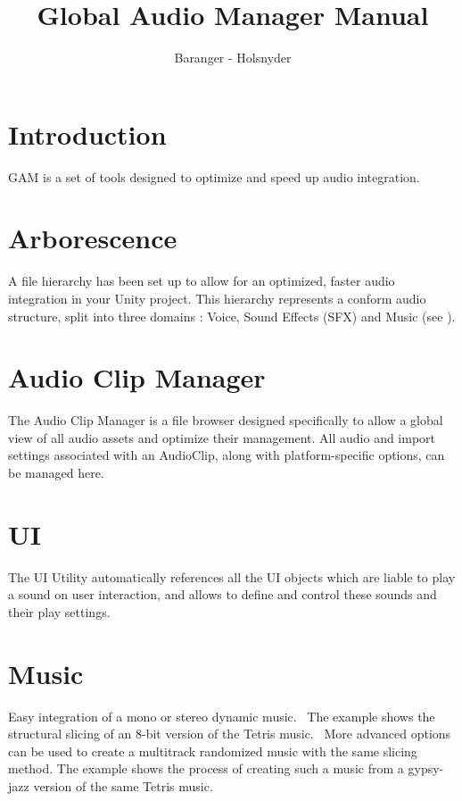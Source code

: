 \documentclass[a4paper,twoside,10pt]{article}
\begin{document}
\title{Global Audio Manager Manual}
\author{Baranger - Holsnyder}
\maketitle

\clearpage


\tableofcontents %

\clearpage



\section*{Introduction}

GAM is a set of tools designed to optimize and speed up audio integration.

\section{Arborescence}

A file hierarchy has been set up to allow for an optimized, faster audio integration in your Unity project. This hierarchy represents a conform audio structure, split into three domains : Voice, Sound Effects (SFX) and Music (see ).


\section{Audio Clip Manager}

The Audio Clip Manager is a file browser designed specifically to allow a global view of all audio assets and optimize their management. All audio and import settings associated with an AudioClip, along with platform-specific options, can be managed here.


\section{UI}

The UI Utility automatically references all the UI objects which are liable to play a sound on user interaction, and allows to define and control these sounds and their play settings.


\section{Music}

Easy integration of a mono or stereo dynamic music. \
The example shows the structural slicing of an 8-bit version of the Tetris music. \
More advanced options can be used to create a multitrack randomized music with the same slicing method. The example shows the process of creating such a music from a gypsy-jazz version of the same Tetris music.
\end{document}
